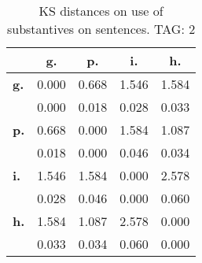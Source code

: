\begin{table}[h!]
\begin{center}
\begin{tabular}{| l || c | c | c | c |}\hline
 & {\bf g.} & {\bf p.} & {\bf i.} & {\bf h.} \\\hline\hline
{\bf g.} & 0.000 & 0.668 & 1.546 & 1.584 \\
{\bf } & 0.000 & 0.018 & 0.028 & 0.033 \\\hline
{\bf p.} & 0.668 & 0.000 & 1.584 & 1.087 \\
{\bf } & 0.018 & 0.000 & 0.046 & 0.034 \\\hline
{\bf i.} & 1.546 & 1.584 & 0.000 & 2.578 \\
{\bf } & 0.028 & 0.046 & 0.000 & 0.060 \\\hline
{\bf h.} & 1.584 & 1.087 & 2.578 & 0.000 \\
{\bf } & 0.033 & 0.034 & 0.060 & 0.000 \\\hline
\end{tabular}
\caption{KS distances on use of substantives on sentences. TAG: 2}
\end{center}
\end{table}